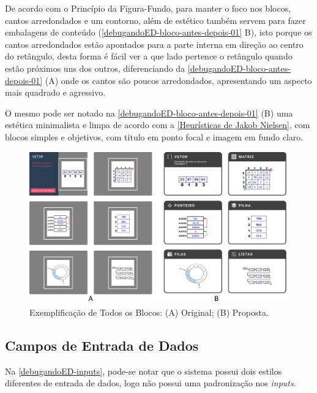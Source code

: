 De acordo com o Princípio da Figura-Fundo, para manter o foco nos blocos, cantos arredondados e um contorno, além de estético também servem para fazer embalagens de conteúdo (\autoref{debugandoED-bloco-antes-depois-01} B), isto porque os cantos arredondados estão apontados para a parte interna em direção ao centro do retângulo, desta forma é fácil ver a que lado pertence o retângulo quando estão próximos uns dos outros, diferenciando da \autoref{debugandoED-bloco-antes-depois-01} (A) onde os cantos são poucos arredondados, apresentando um aspecto mais quadrado e agressivo.

O mesmo pode ser notado na \autoref{debugandoED-bloco-antes-depois-01} (B) uma estética minimalista e limpa de acordo com a \autoref{Heurísticas de Jakob Nielsen}, com blocos simples e objetivos, com titulo em ponto focal e imagem em fundo claro.

\begin{figure}[htb]
    \begin{center}
	    \includegraphics[scale=0.25]{figs/debugandoED-bloco-antes-depois-01.png}
	\end{center}
    \caption{\label{debugandoED-bloco-antes-depois-01}Exemplificação de Todos os Blocos: (A) Original; (B) Proposta.}
\end{figure}


\subsection{Campos de Entrada de Dados}
\label{Campos_de_Entrada_de_Dados}

Na \autoref{debugandoED-inputs}, pode-se notar que o sistema possui dois estilos diferentes de entrada de dados, logo não possui uma padronização nos \textit{inputs}.

